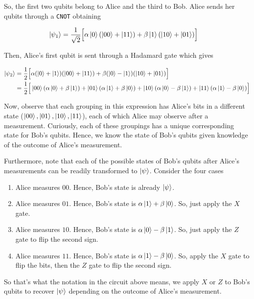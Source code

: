 \documentclass[main.tex]{subfiles}
\begin{document}
\begin{subappendices}
So, the first two qubits belong to Alice and the third to Bob. Alice sends her qubits through a \texttt{CNOT} obtaining

\begin{align*}
\ket{\psi_1} &= \frac{1}{\sqrt{2}}\Big[\alpha\ket{0}(\ket{00} + \ket{11}) + \beta\ket{1}(\ket{10} + \ket{01})\Big]
\end{align*}

Then, Alice's first qubit is sent through a Hadamard gate which gives

\begin{align*}
\ket{\psi_2} &= \frac{1}{2}\Big[\alpha(\ket{0}+\ket{1})(\ket{00} + \ket{11}) + \beta(\ket{0}-\ket{1})(\ket{10} + \ket{01})\Big] \\
&= \frac{1}{2}\Big[ \ket{00} (\alpha\ket{0} + \beta\ket{1}) + \ket{01}(\alpha\ket{1} + \beta \ket{0}) + \ket{10}(\alpha\ket{0} - \beta\ket{1}) + \ket{11}(\alpha\ket{1} - \beta\ket{0}) \Big]
\end{align*}

Now, observe that each grouping in this expression has Alice's bits in a different state ($\ket{00},\ket{01},\ket{10},\ket{11}$), each of which Alice may observe after a measurement. Curiously, each of these groupings has a unique corresponding state for Bob's qubits. Hence, we know the state of Bob's qubits given knowledge of the outcome of Alice's measurement.

Furthermore, note that each of the possible states of Bob's qubits after Alice's measurements can be readily transformed to $\ket{\psi}$. Consider the four cases

\begin{enumerate}
\item Alice measures $00$. Hence, Bob's state is already $\ket{\psi}$. 
\item Alice measures $01$. Hence, Bob's state is $\alpha\ket{1} + \beta \ket{0}$. So, just apply the $X$ gate. 
\item Alice measures $10$. Hence, Bob's state is $\alpha\ket{0} - \beta\ket{1}$. So, just apply the $Z$ gate to flip the second sign. 
\item Alice measures $11$. Hence, Bob's state is $\alpha\ket{1} - \beta\ket{0}$. So, apply the $X$ gate to flip the bits, then the $Z$ gate to flip the second sign. 
\end{enumerate}

So that's what the notation in the circuit above means, we apply $X$ or $Z$ to Bob's qubits to recover $\ket{\psi}$ depending on the outcome of Alice's measurement.


\end{subappendices}
\end{document}
